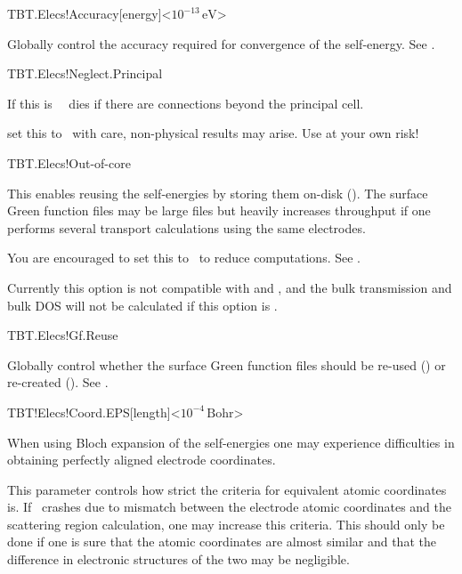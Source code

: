 \begin{fdfentry}{TBT.Elecs!Accuracy}[energy]<$10^{-13}\,\mathrm{eV}$>
  
  Globally control the accuracy required for convergence of the self-energy.
  See .
  
\end{fdfentry}

\begin{fdflogicalF}{TBT.Elecs!Neglect.Principal}

  If this is \fdffalse\ \tsiesta\ dies if there are connections beyond
  the principal cell.

  \note set this to \fdftrue\ with care, non-physical results may
  arise. Use at your own risk!

\end{fdflogicalF}  

\begin{fdflogicalF}{TBT.Elecs!Out-of-core}

  This enables reusing the self-energies by storing them on-disk
  (\fdftrue). The surface Green function files may be large files but
  heavily increases throughput if one performs several transport
  calculations using the same electrodes.

  You are encouraged to set this to \fdftrue\ to reduce computations. 
  See .

  Currently this option is not compatible with  and
  , and the bulk transmission and bulk DOS will not
  be calculated if this option is \fdftrue.
  
\end{fdflogicalF}

\begin{fdflogicalT}{TBT.Elecs!Gf.Reuse}
  
  Globally control whether the surface Green function files should
  be re-used (\fdftrue) or re-created (\fdffalse).
  See .
  
\end{fdflogicalT}


\begin{fdfentry}{TBT!Elecs!Coord.EPS}[length]<$10^{-4}\,\mathrm{Bohr}$>

  When using Bloch expansion of the self-energies one may experience
  difficulties in obtaining perfectly aligned electrode coordinates.

  This parameter controls how strict the criteria for equivalent
  atomic coordinates is. If \tsiesta\ crashes due to mismatch between
  the electrode atomic coordinates and the scattering region
  calculation, one may increase this criteria. This should only be
  done if one is sure that the atomic coordinates are almost similar
  and that the difference in electronic structures of the two may be
  negligible.
  
\end{fdfentry}


